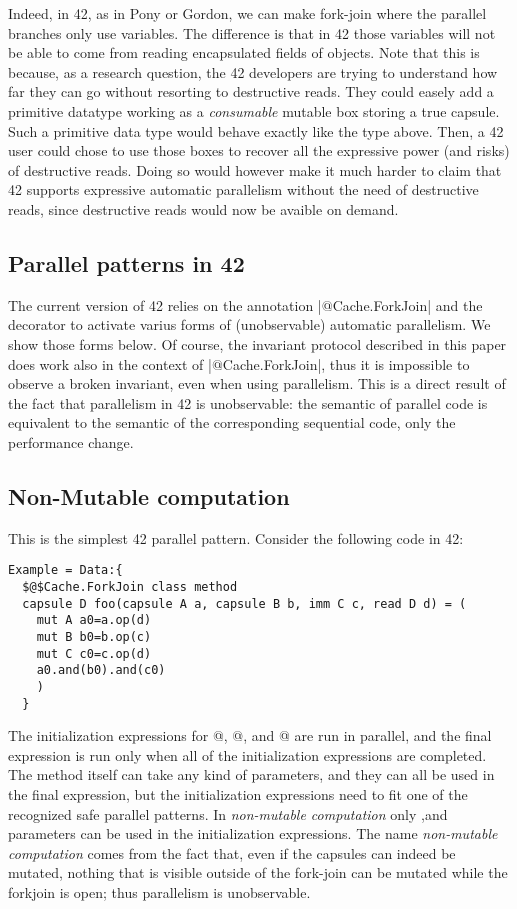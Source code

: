 Indeed, in 42, as in Pony or Gordon, we can make fork-join where the parallel branches only use \Q@capsule@ variables.
The difference is that in 42 those variables will not be able to come from reading encapsulated fields of \Q@mut@ objects.
Note that this is because, as a research question, the 42 developers are trying to understand how far they can go without resorting to destructive reads.
They could easely add a primitive datatype working as a \emph{consumable} mutable box storing a true capsule. Such a primitive data type would behave exactly like the \Q@Box@ type above.
Then, a 42 user could chose to use those boxes to recover all the expressive power (and risks) of destructive reads.
Doing so would however make it much harder to claim that 42 supports expressive automatic parallelism without the need of destructive reads, since destructive reads would now be avaible on demand.

\subsection*{Parallel patterns in 42}

The current version of 42 relies on the annotation \Q|$@$Cache.ForkJoin| and the \Q@Data@ decorator to activate varius forms of (unobservable) automatic parallelism. We show those forms below.
Of course, the invariant protocol described in this paper does work also in the context of \Q|$@$Cache.ForkJoin|, thus it is impossible to observe a broken invariant, even when using parallelism. This is a direct result of the fact that parallelism in 42 is unobservable: the semantic of parallel code is equivalent to the semantic of the corresponding sequential code, only the performance change.


\subsection*{Non-Mutable computation}
This is the simplest 42 parallel pattern.
Consider the following code in 42:
\begin{lstlisting}[deletekeywords=label]
Example = Data:{
  $@$Cache.ForkJoin class method 
  capsule D foo(capsule A a, capsule B b, imm C c, read D d) = (
    mut A a0=a.op(d)
    mut B b0=b.op(c)
    mut C c0=c.op(d)
    a0.and(b0).and(c0)
    )
  }
\end{lstlisting}
The initialization expressions for @, @, and 
@ are run in parallel, and the final expression is run only when 
all of the initialization expressions are completed.
The method itself can take any kind of parameters, and they can all be used in the final expression, but the initialization expressions need to fit one of the recognized
safe parallel patterns. In \emph{non-mutable computation} only \Q@read@,\Q@capsule@ and \Q@imm@ parameters can be used in the initialization expressions.
The name \emph{non-mutable computation} comes from the fact that, even if the capsules can indeed be mutated, nothing that is visible outside of the fork-join can be mutated while the forkjoin is open; thus parallelism is unobservable.

